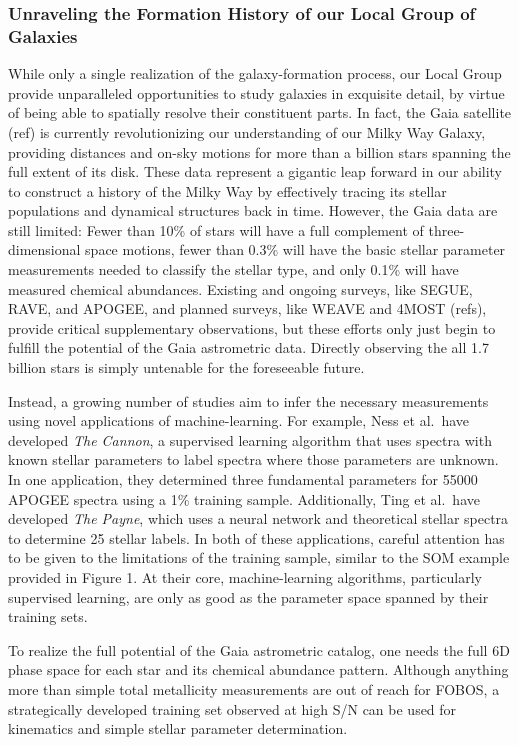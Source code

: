 \documentclass[oneside,11pt]{amsart}
\newcommand{\comment}[2][todo]{{\color{#1}[[{\bf #2}]]}}
\newcounter{chalno}
\newcommand{\chal}[1]{\refstepcounter{chalno}\label{#1}}
\begin{document}
\subsubsection{Unraveling the Formation History of our Local Group of Galaxies}
\label{sec:localgroup}
\noindent \comment{1 page}

While only a single realization of the galaxy-formation process, our
Local Group provide unparalleled opportunities to study galaxies in
exquisite detail, by virtue of being able to spatially resolve their
constituent parts.  In fact, the Gaia satellite (ref) is currently
revolutionizing our understanding of our Milky Way Galaxy, providing
distances and on-sky motions for more than a billion stars spanning the
full extent of its disk.  These data represent a gigantic leap forward
in our ability to construct a history of the Milky Way by effectively
tracing its stellar populations and dynamical structures back in time.
However, the Gaia data are still limited: Fewer than 10\% of stars will
have a full complement of three-dimensional space motions, fewer than
0.3\% will have the basic stellar parameter measurements needed to
classify the stellar type, and only 0.1\% will have measured chemical
abundances.  Existing and ongoing surveys, like SEGUE, RAVE, and APOGEE,
and planned surveys, like WEAVE and 4MOST (refs), provide critical
supplementary observations, but these efforts only just begin to fulfill
the potential of the Gaia astrometric data.  Directly observing the all
1.7 billion stars is simply untenable for the foreseeable future.

Instead, a growing number of studies aim to infer the necessary
measurements using novel applications of machine-learning.  For example,
Ness et al.\ have developed {\it The Cannon}, a supervised learning
algorithm that uses spectra with known stellar parameters to label
spectra where those parameters are unknown.  In one application, they
determined three fundamental parameters for 55000 APOGEE spectra using a
1\% training sample.  Additionally, Ting et al.\ have developed {\it The
Payne}, which uses a neural network and theoretical stellar spectra to
determine 25 stellar labels.  In both of these applications, careful
attention has to be given to the limitations of the training sample,
similar to the SOM example provided in Figure 1.  At their core,
machine-learning algorithms, particularly supervised learning, are only
as good as the parameter space spanned by their training sets.

\medskip \chal{gaia}   To
realize the full potential of the Gaia astrometric catalog, one needs
the full 6D phase space for each star and its chemical abundance
pattern.  Although anything more than simple total metallicity
measurements are out of reach for FOBOS, a strategically developed
training set observed at high S/N can be used for kinematics and simple
stellar parameter determination.
\end{document}
